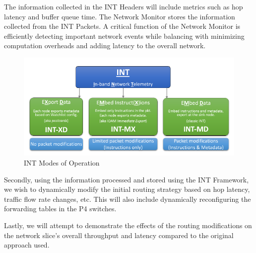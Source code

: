 \documentclass[conference]{IEEEtran}
\begin{document}
The information collected in the INT Headers will include metrics such as hop latency and buffer queue time. The Network Monitor stores the information collected from the INT Packets. A critical function of the Network Monitor is efficiently detecting important network events while balancing with minimizing computation overheads and adding latency to the overall network. \\

\begin{figure}[htbp]
\centering
\includegraphics[scale=0.5]{INT_Modes_of_Operation.png}
\caption{INT Modes of Operation \cite{b14}}
\label{fig}
\end{figure}

Secondly, using the information processed and stored using the INT Framework, we wish to dynamically modify the initial routing strategy based on hop latency, traffic flow rate changes, etc. This will also include dynamically reconfiguring the forwarding tables in the P4 switches.

Lastly, we will attempt to demonstrate the effects of the routing modifications on the network slice’s overall throughput and latency compared to the original approach used.
\end{document}

